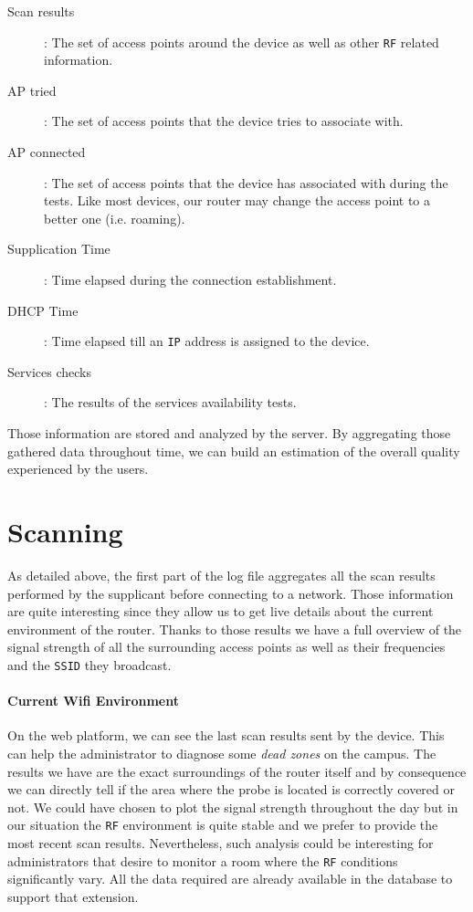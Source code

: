 \begin{description}
	\item[Scan results]: The set of access points around the device as well as other \texttt{RF} related information.
	\item[AP tried]: The set of access points that the device tries to associate with.
	\item[AP connected]: The set of access points that the device has associated with during the tests. Like most devices, our router may change the access point to a better one (i.e. roaming).
	\item[Supplication Time]: Time elapsed during the connection establishment.
	\item [DHCP Time]: Time elapsed till an \texttt{IP} address is assigned to the device.
	\item [Services checks]: The results of the services availability tests.
\end{description}

Those information are stored and analyzed by the server. By aggregating those gathered data throughout time, we can build an estimation of the overall quality experienced by the users.

\section{Scanning}
As detailed above, the first part of the log file aggregates all the scan results performed by the supplicant before connecting to a network. Those information are quite interesting since they allow us to get live details about the current environment of the router. Thanks to those results we have a full overview of the signal strength of all the surrounding access points as well as their frequencies and the \texttt{SSID} they broadcast. 


\paragraph*{Current Wifi Environment} On the web platform, we can see the last scan results sent by the device. This can help the administrator to diagnose some \emph{dead zones} on the campus. The results we have are the exact surroundings of the router itself and by consequence we can directly tell if the area where the probe is located is correctly covered or not. We could have chosen to plot the signal strength throughout the day but in our situation the \texttt{RF} environment is quite stable and we prefer to provide the most recent scan results. Nevertheless, such analysis could be interesting for administrators that desire to monitor a room where the \texttt{RF} conditions significantly vary. All the data required are already available in the database to support that extension.

